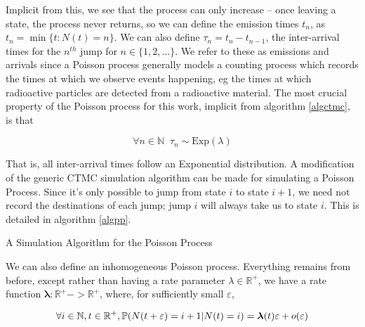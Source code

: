 Implicit from this, we see that the process can only increase -- once leaving a state, the process never returns, so we can define the emission times $t_n$, as $t_n = \min\{t : N(t)= n\}$. We can also define $\tau_n = t_n-t_{n-1}$, the inter-arrival times for the $n^{th}$ jump for $n \in \{1,2,...\}$. We refer to these as emissions and arrivals since a Poisson process generally models a counting process which records the times at which we observe events happening, eg the times at which radioactive particles are detected from a radioactive material. The most crucial property of the Poisson process for this work, implicit from algorithm \ref{algctmc}, is that

$$
\forall n \in \mathbb{N} \; \; \tau_n \sim \mathrm{Exp}(\lambda)
$$

That is, all inter-arrival times follow an Exponential distribution. A modification of the generic CTMC simulation algorithm can be made for simulating  a Poisson Process. Since it's only possible to jump from state $i$ to state $i+1$, we need not record the destinations of each jump; jump $i$ will always take us to state $i$. This is detailed in algorithm \ref{algpp}.

\begin{algorithm}
\SetAlgoLined
{}

\caption{A Simulation Algorithm for the Poisson Process}\label{algpp}

\end{algorithm}

We can also define an inhomogeneous Poisson process. Everything remains from before, except rather than having a rate parameter $\lambda \in \mathbb{R}^{+}$, we have a rate function $\bm{\lambda} : \mathbb{R}^{+} -> \mathbb{R}^{+}$, where, for sufficiently small $\varepsilon$,

$$
\forall i \in \mathbb{N}, t \in \mathbb{R}^{+}, \mathbb{P} (N(t+\varepsilon) = i+1 | N(t) = i) = \bm{\lambda}(t) \varepsilon + o(\varepsilon)
$$

